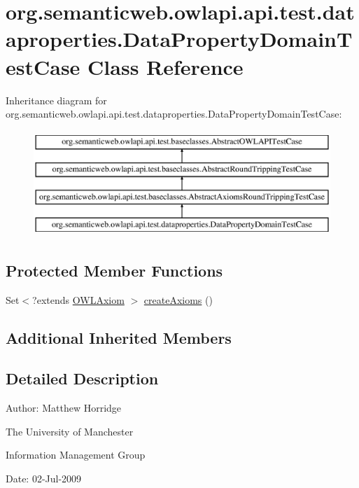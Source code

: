 \hypertarget{classorg_1_1semanticweb_1_1owlapi_1_1api_1_1test_1_1dataproperties_1_1_data_property_domain_test_case}{\section{org.\-semanticweb.\-owlapi.\-api.\-test.\-dataproperties.\-Data\-Property\-Domain\-Test\-Case Class Reference}
\label{classorg_1_1semanticweb_1_1owlapi_1_1api_1_1test_1_1dataproperties_1_1_data_property_domain_test_case}
}
Inheritance diagram for org.\-semanticweb.\-owlapi.\-api.\-test.\-dataproperties.\-Data\-Property\-Domain\-Test\-Case\-:\begin{figure}[H]
\begin{center}
\leavevmode
\includegraphics[height=4.000000cm]{classorg_1_1semanticweb_1_1owlapi_1_1api_1_1test_1_1dataproperties_1_1_data_property_domain_test_case}
\end{center}
\end{figure}
\subsection*{Protected Member Functions}
\begin{DoxyCompactItemize}
\item 
Set$<$?extends \hyperlink{interfaceorg_1_1semanticweb_1_1owlapi_1_1model_1_1_o_w_l_axiom}{O\-W\-L\-Axiom} $>$ \hyperlink{classorg_1_1semanticweb_1_1owlapi_1_1api_1_1test_1_1dataproperties_1_1_data_property_domain_test_case_afc8a81b3af439e150599a03dd12ad8fb}{create\-Axioms} ()
\end{DoxyCompactItemize}
\subsection*{Additional Inherited Members}


\subsection{Detailed Description}
Author\-: Matthew Horridge\par
 The University of Manchester\par
 Information Management Group\par
 Date\-: 02-\/\-Jul-\/2009 

